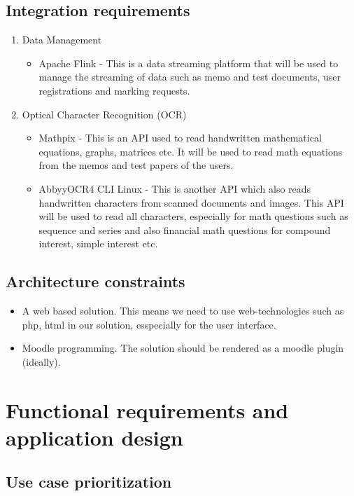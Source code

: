 \documentclass{article}
\begin{document}
	\subsection{Integration requirements}
	\begin{enumerate}
		\item Data Management
		\begin{itemize}
			\item Apache Flink - This is a data streaming platform that will be used to manage the streaming of data such as memo and test documents, user registrations and marking requests.
		\end{itemize}
		\item Optical Character Recognition (OCR)
		\begin{itemize}
			\item Mathpix - This is an API used to read handwritten mathematical equations, graphs, matrices etc. It will be used to read math equations from the memos and test papers of the users.
			\item AbbyyOCR4 CLI Linux - This is another API which also reads handwritten characters from scanned documents and images. This API will be used to read all characters, especially for math questions such as sequence and series and also financial math questions for compound interest, simple interest etc.
		\end{itemize}
	\end{enumerate}
	\subsection{Architecture constraints}	
	\begin{itemize}
		\item A web based solution. This means we need to use web-technologies such as php, html in our solution, esspecially for the user interface.
		\item Moodle programming. The solution should be rendered as a moodle plugin (ideally).
	\end{itemize}
\section{Functional requirements and application design}

	\subsection{Use case prioritization}
\end{document}
